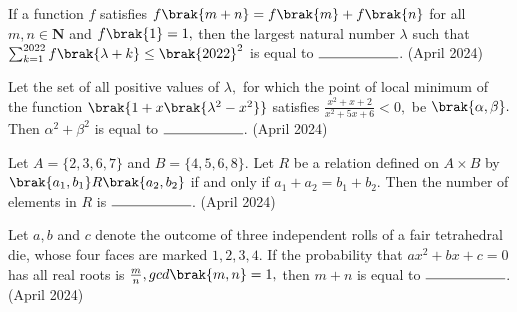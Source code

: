   \item If a function $f$ satisfies $f\brak{m+n} = f\brak{m} + f\brak{n}$ for all $m,n \in \textbf{N}$ and $f\brak{1} = 1,$ then the largest natural number $\lambda$ such that $\sum_{k=1}^{2022} f\brak{\lambda + k} \le \brak{2022} ^ 2$ is equal to $\rule{2cm}{0.15mm}$.
  \hfill(April 2024) \\

  \item Let the set of all positive values of $\lambda,$ for which the point of local minimum of the function $\brak{1+x\brak{{\lambda} ^2 - x^2}}$ satisfies $\frac{x^2 + x+2}{x^2+5x+6} < 0,$ be $\brak{\alpha, \beta}.$ Then ${\alpha}^2 + {\beta}^2$ is equal to $\rule{2cm}{0.15mm}$.
  \hfill(April 2024) \\ 

  \item Let $A = \{2, 3, 6, 7\}$ and $B = \{4,5,6,8\}.$ Let $R$ be a relation defined on $A \times B$ by $\brak{a_1,b_1} R \brak{a_2,b_2}$ if and only if $a_1+a_2 = b_1 + b_2.$ Then the number of elements in $R$ is $\rule{2cm}{0.15mm}$.
  \hfill(April 2024) \\ 

  \item Let $a,b$ and $c$ denote the outcome of three independent rolls of a fair tetrahedral die, whose four faces are marked $1,2,3,4.$ If the probability that $ax^2 + bx +c=0$ has all real roots is $\frac{m}{n}, gcd\brak{m,n}=1,$ then $m+n$ is equal to $\rule{2cm}{0.15mm}$.
  \hfill(April 2024) \\ 

  
